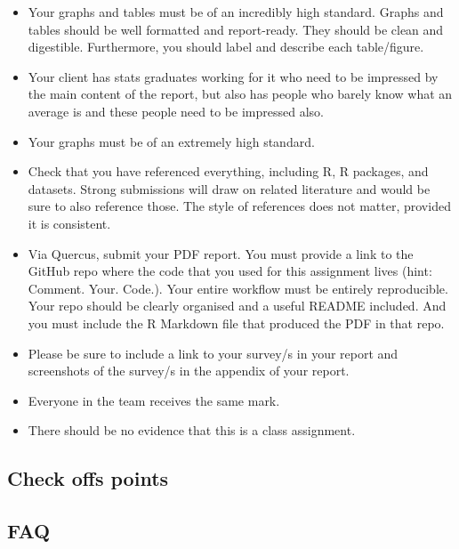 \documentclass[
]{book}
\begin{document}
\begin{itemize}
\item
  Your graphs and tables must be of an incredibly high standard. Graphs and tables should be well formatted and report-ready. They should be clean and digestible. Furthermore, you should label and describe each table/figure.
\item
  Your client has stats graduates working for it who need to be impressed by the main content of the report, but also has people who barely know what an average is and these people need to be impressed also.
\item
  Your graphs must be of an extremely high standard.
\item
  Check that you have referenced everything, including R, R packages, and datasets. Strong submissions will draw on related literature and would be sure to also reference those. The style of references does not matter, provided it is consistent.
\item
  Via Quercus, submit your PDF report. You must provide a link to the GitHub repo where the code that you used for this assignment lives (hint: Comment. Your. Code.). Your entire workflow must be entirely reproducible. Your repo should be clearly organised and a useful README included. And you must include the R Markdown file that produced the PDF in that repo.
\item
  Please be sure to include a link to your survey/s in your report and screenshots of the survey/s in the appendix of your report.
\item
  Everyone in the team receives the same mark.
\item
  There should be no evidence that this is a class assignment.
\end{itemize}

\hypertarget{check-offs-points-1}{%
\subsection{Check offs points}\label{check-offs-points-1}}

\hypertarget{faq-1}{%
\subsection{FAQ}\label{faq-1}}
\end{document}
